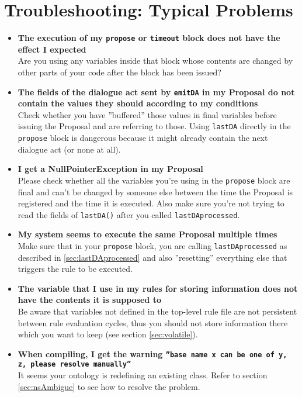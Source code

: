 \section{Troubleshooting: Typical Problems}

\begin{itemize}
	
	\item \textbf{The execution of my \texttt{propose} or \texttt{timeout} block does not have the effect I expected}\\
	Are you using any variables inside that block whose contents are changed by other parts of your code after the block has been issued?
	
	\item \textbf{The fields of the dialogue act sent by \texttt{emitDA} in my Proposal do not contain the values they should according to my conditions}\\
	Check whether you have ''buffered'' those values in final variables before issuing the Proposal and are referring to those. Using \texttt{lastDA} directly in the \texttt{propose} block is dangerous because it might already contain the next dialogue act (or none at all).
	
	\item \textbf{I get a NullPointerException in my Proposal}\\
	Please check whether all the variables you're using in the \texttt{propose} block are final and can't be changed by someone else between the time the Proposal is registered and the time it is executed. Also make sure you're not trying to read the fields of \texttt{lastDA()} after you called \texttt{lastDAprocessed}.
	
	\item \textbf{My system seems to execute the same Proposal multiple times}\\
	Make sure that in your \texttt{propose} block, you are calling \texttt{lastDAprocessed} as described in \ref{sec:lastDAprocessed} and also ''resetting'' everything else that triggers the rule to be executed.
	
	\item \textbf{The variable that I use in my rules for storing information does not have the contents it is supposed to}\\
	Be aware that variables not defined in the top-level rule file are not persistent between rule evaluation cycles, thus you should not store information there which you want to keep (see section \ref{sec:volatile}).
	
	\item \textbf{When compiling, I get the warning \texttt{''base name x can be one of y, z, please resolve manually''}}\\
	It seems your ontology is redefining an existing class. Refer to section \ref{sec:nsAmbigue} to see how to resolve the problem.
	
\end{itemize}